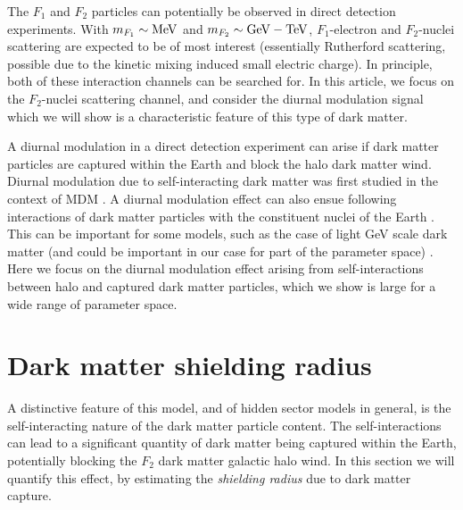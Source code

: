 \documentclass[12pt]{article}
\begin{document}
The $F_1$ and $F_2$ particles can potentially be observed in direct detection experiments. With $m _{F_1} \sim \rm MeV$ and $m _{F_2} \sim \rm GeV-TeV$, $F_1$-electron and $F_2$-nuclei scattering are expected to be of most interest (essentially Rutherford scattering, possible due to the kinetic mixing induced small electric charge). In principle, both of these interaction channels can be searched for. In this article, we focus on the $F_2$-nuclei scattering channel, and consider the diurnal modulation signal which we will show is a characteristic feature of this type of dark matter.

A diurnal modulation in a direct detection experiment can arise if dark matter particles are captured within the Earth and block the halo dark matter wind. Diurnal modulation due to self-interacting dark matter was first studied in the context of MDM \cite{footdiurnal}. A diurnal modulation effect can also ensue following interactions of dark matter particles with the constituent nuclei of the Earth \cite{collar}. This can be important for some models, such as the case of light GeV scale dark matter (and could be important in our case for part of the parameter space) \cite{shoemaker}. Here we focus on the diurnal modulation effect arising from self-interactions between halo and captured dark matter particles, which we show is large for a wide range of parameter space.

\section{Dark matter shielding radius}

A distinctive feature of this model, and of hidden sector models in general, is the self-interacting nature of the dark matter particle content. The self-interactions can lead to a significant quantity of dark matter being captured within the Earth, potentially blocking the $F_2$ dark matter galactic halo wind. In this section we will quantify this effect, by estimating the \textit{shielding radius} due to dark matter capture.
\end{document}
